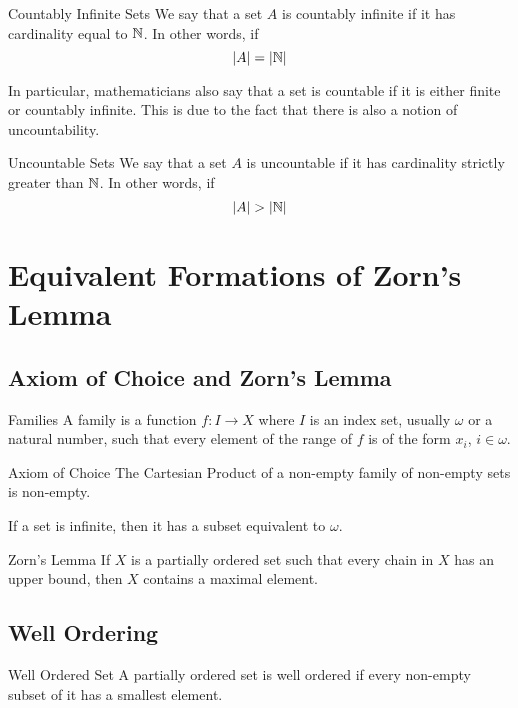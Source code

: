 \documentclass[a4paper]{article}
\begin{document}
\begin{defn}{Countably Infinite Sets}{} We say that a set $A$ is countably infinite if it has cardinality equal to $\mathbb{N}$. In other words, if $$\abs{A}=\abs{\mathbb{N}}$$
\end{defn}

In particular, mathematicians also say that a set is countable if it is either finite or countably infinite. This is due to the fact that there is also a notion of uncountability. 

\begin{defn}{Uncountable Sets}{} We say that a set $A$ is uncountable if it has cardinality strictly greater than $\mathbb{N}$. In other words, if $$\abs{A}>\abs{\mathbb{N}}$$
\end{defn}

\pagebreak
\section{Equivalent Formations of Zorn's Lemma}
\subsection{Axiom of Choice and Zorn's Lemma}
\begin{defn}{Families}{} A family is a function $f:I\to X$ where $I$ is an index set, usually $\omega$ or a natural number, such that every element of the range of $f$ is of the form $x_i$, $i\in\omega$. 
\end{defn}

\begin{axm}{Axiom of Choice}{} The Cartesian Product of a non-empty family of non-empty sets is non-empty. 
\end{axm}

\begin{thm}{}{} If a set is infinite, then it has a subset equivalent to $\omega$. 
\end{thm}

\begin{thm}{Zorn's Lemma}{} If $X$ is a partially ordered set such that every chain in $X$ has an upper bound, then $X$ contains a maximal element. 
\end{thm}

\subsection{Well Ordering}
\begin{defn}{Well Ordered Set}{} A partially ordered set is well ordered if every non-empty subset of it has a smallest element. 
\end{defn}
\end{document}
